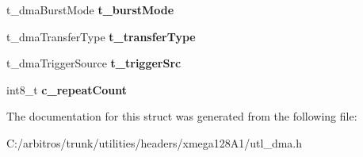 \begin{DoxyCompactItemize}
\item 
\hypertarget{structt__dma_chan_config_a940ca43bafb4ddb696adfcf88fcf5f98}{t\-\_\-dma\-Burst\-Mode {\bfseries t\-\_\-burst\-Mode}}\label{structt__dma_chan_config_a940ca43bafb4ddb696adfcf88fcf5f98}

\item 
\hypertarget{structt__dma_chan_config_a515dce384709133623c34403a24be1b6}{t\-\_\-dma\-Transfer\-Type {\bfseries t\-\_\-transfer\-Type}}\label{structt__dma_chan_config_a515dce384709133623c34403a24be1b6}

\item 
\hypertarget{structt__dma_chan_config_a15e200678935e2debb01f9d7ba29b51d}{t\-\_\-dma\-Trigger\-Source {\bfseries t\-\_\-trigger\-Src}}\label{structt__dma_chan_config_a15e200678935e2debb01f9d7ba29b51d}

\item 
\hypertarget{structt__dma_chan_config_a9509d29aa7f8bc699852e940a3e90c25}{int8\-\_\-t {\bfseries c\-\_\-repeat\-Count}}\label{structt__dma_chan_config_a9509d29aa7f8bc699852e940a3e90c25}

\end{DoxyCompactItemize}


The documentation for this struct was generated from the following file\-:\begin{DoxyCompactItemize}
\item 
C\-:/arbitros/trunk/utilities/headers/xmega128\-A1/utl\-\_\-dma.\-h\end{DoxyCompactItemize}
